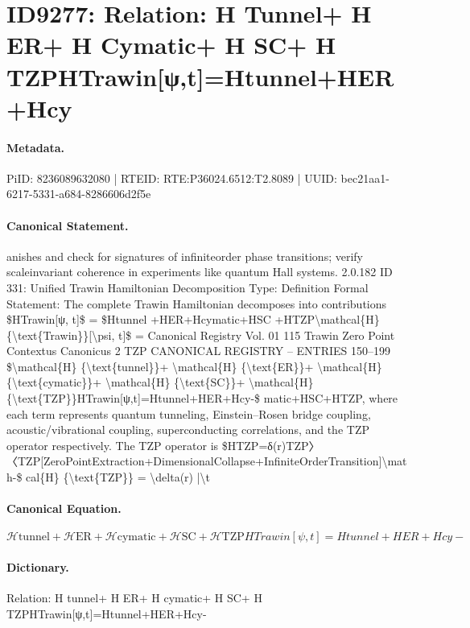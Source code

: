 \section*{ID9277: Relation: H Tunnel+ H ER+ H Cymatic+ H SC+ H TZPHTrawin[ψ,t]=Htunnel+HER+Hcy}
\paragraph{Metadata.}
PiID: 8236089632080 | RTEID: RTE:P36024.6512:T2.8089 | UUID: bec21aa1-6217-5331-a684-8286606d2f5e

\paragraph{Canonical Statement.}
anishes and check for signatures of infiniteorder phase transitions; verify scaleinvariant coherence in experiments like quantum Hall systems. 2.0.182 ID 331: Unified Trawin Hamiltonian Decomposition Type: Definition Formal Statement: The complete Trawin Hamiltonian decomposes into contributions \$HTrawin[ψ, t]\$ = \$Htunnel +HER+Hcymatic+HSC +HTZP\textbackslash{}mathcal\{H\} \{\textbackslash{}text\{Trawin\}\}[\textbackslash{}psi, t]\$ = Canonical Registry Vol. 01 115 Trawin Zero Point Contextus Canonicus 2 TZP CANONICAL REGISTRY – ENTRIES 150–199 \$\textbackslash{}mathcal\{H\} \{\textbackslash{}text\{tunnel\}\}+ \textbackslash{}mathcal\{H\} \{\textbackslash{}text\{ER\}\}+ \textbackslash{}mathcal\{H\} \{\textbackslash{}text\{cymatic\}\}+ \textbackslash{}mathcal\{H\} \{\textbackslash{}text\{SC\}\}+ \textbackslash{}mathcal\{H\} \{\textbackslash{}text\{TZP\}\}HTrawin[ψ,t]=Htunnel+HER+Hcy-\$ matic+HSC+HTZP, where each term represents quantum tunneling, Einstein–Rosen bridge coupling, acoustic/vibrational coupling, superconducting correlations, and the TZP operator respectively. The TZP operator is \$HTZP=δ(r)TZP〉〈TZP[ZeroPointExtraction+DimensionalCollapse+InfiniteOrderTransition]\textbackslash{}math-\$ cal\{H\} \{\textbackslash{}text\{TZP\}\} = \textbackslash{}delta(r) |\textbackslash{}t

\paragraph{Canonical Equation.}
\[
\mathcal{H} {\text{tunnel}}+ \mathcal{H} {\text{ER}}+ \mathcal{H} {\text{cymatic}}+ \mathcal{H} {\text{SC}}+ \mathcal{H} {\text{TZP}}HTrawin[ψ,t]=Htunnel+HER+Hcy-
\]

\paragraph{Dictionary.}
Relation: H tunnel+ H ER+ H cymatic+ H SC+ H TZPHTrawin[ψ,t]=Htunnel+HER+Hcy-

